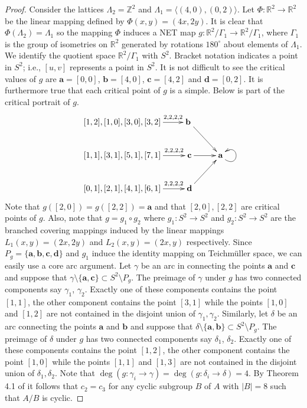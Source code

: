 \documentclass[article,dvisp]{amsart}
\renewcommand{\a}{\mathcal{A}}
\renewcommand{\b}{\mathcal{B}}
\def\a{\textbf{a}}
\def\b{\textbf{b}}
\def\c{\textbf{c}}
\def\d{\textbf{d}}
\def\R{\mathbb{R}}
\def\Z{\mathbb{Z}}
\theoremstyle{definition}
\theoremstyle{remark}
\numberwithin{equation}{section}
\theoremstyle{lemma}
\begin{document}
\begin{proof} Consider the lattices $\Lambda_{2}=\Z^{2}$ and $\Lambda_{1}=\langle(4,0),(0,2)\rangle$. Let $\Phi:\R^{2}\to\R^2$ be the linear mapping defined by $\Phi(x,y)=(4x,2y)$. It is clear that $\Phi(\Lambda_{2})=\Lambda_{1}$
so the mapping $\Phi$ induces a NET map $g:\R^{2}/\Gamma_{1}\to\R^{2}/\Gamma_{1}$, where $\Gamma_{1}$ is the group of isometries on $\R^2$ generated by rotations $180^{\circ}$ about elements of $\Lambda_{1}$. We identify the quotient space $\R^{2}/\Gamma_{1}$ with $S^2$. Bracket notation indicates a point in $S^2$; i.e., $[u,v]$ represents a point in $S^{2}$. It is not difficult to see the critical values of $g$ are $\a=[0,0]$, $\b=[4,0]$, $\c=[4,2]$ and $\d=[0,2]$. It is furthermore true that each critical point of $g$ is a simple. Below is part of the critical portrait of $g$.
\[\xymatrix{
[1,2],[1,0],[3,0],[3,2]\ar[r]^-{2,2,2,2} &\b \ \ar[rd]\\
[1,1],[3,1],[5,1],[7,1]\ar[r]^-{2,2,2,2} &\c \ar[r] & \a\ar@(dr,ur)[]\\
[0,1],[2,1],[4,1],[6,1]\ar[r]^-{2,2,2,2} &\d\ar[ru]\\ 
}\]
Note that $g([2,0])=g([2,2])=\a$ and that $[2,0], [2,2]$ are critical points of $g$. Also, note that $g=g_{1}\circ g_{2}$ where $g_{1}:S^{2}\to S^{2}$ and $g_{2}:S^{2}\to S^{2}$ are the branched covering mappings induced by the linear mappings $L_{1}(x,y)=(2x,2y)$ and $L_{2}(x,y)=(2x,y)$ respectively. Since $P_{g}=\{\a,\b,\c,\d\}$ and $g_{1}$ induce the identity mapping on Teichm\"uller space, we can easily use a core arc argument. Let $\gamma$ be an arc in connecting the points $\a$ and $\c$ and suppose that $\gamma\setminus\{\a,\c\}\subset S^{2}\setminus P_{g}$. The preimage of $\gamma$ under $g$ has two connected components say $\gamma_{1}$, $\gamma_{2}$. Exactly one of these components contains the point $[1,1]$, the other component contains the point $[3,1]$ while the points $[1,0]$ and $[1,2]$ are not contained in the disjoint union of $\gamma_{1}, \gamma_{2}$. Similarly, let $\delta$ be an arc  connecting the points $\a$ and $\b$ and suppose that $\delta\setminus\{\a,\b\}\subset S^{2}\setminus P_{g}$. The preimage of $\delta$ under $g$ has two connected components say $\delta_{1}$, $\delta_{2}$. Exactly one of these components contains the point $[1,2]$, the other component contains the point $[1,0]$ while the points $[1,1]$ and $[1,3]$ are not contained in the disjoint union of $\delta_{1}, \delta_{2}$. Note that $\deg(g:\gamma_{i}\to\gamma)=\deg(g:\delta_{i}\to\delta)=4$. By Theorem 4.1 of \cite{CFPP} it follows that $c_{2}=c_{3}$ for any cyclic subgroup $B$ of $A$ with $|B|=8$ such that $A/B$ is cyclic.


\end{proof}
\end{document}
